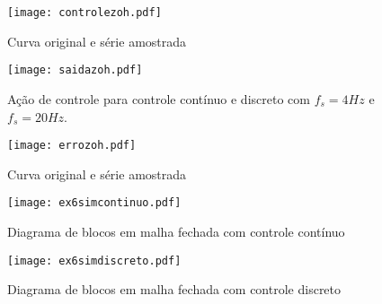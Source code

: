     \begin{figure}[H]
	\center
	\texttt{[image: controlezoh.pdf]}
	\caption{Curva original e série amostrada}
	\label{fig:ex6controle}
    \end{figure}
    
\newpage

    \begin{figure}[htp]
	\center
	\texttt{[image: saidazoh.pdf]}
	\caption{Ação de controle para controle contínuo e discreto com $f_s = 4 Hz$ e $f_s = 20 Hz$. }
	\label{fig:ex6saida}
    \end{figure}

    \begin{figure}[H]
	\center
	\texttt{[image: errozoh.pdf]}
	\caption{Curva original e série amostrada}
	\label{fig:ex6erro}
    \end{figure}
    
    \begin{figure}[H]
	\center
	\texttt{[image: ex6simcontinuo.pdf]}
	\caption{Diagrama de blocos em malha fechada com controle contínuo}
	\label{fig:ex6continuo}
    \end{figure}

    \begin{figure}[H]
	\center
	\texttt{[image: ex6simdiscreto.pdf]}
	\caption{Diagrama de blocos em malha fechada com controle discreto}
	\label{fig:ex6discreto}
    \end{figure}